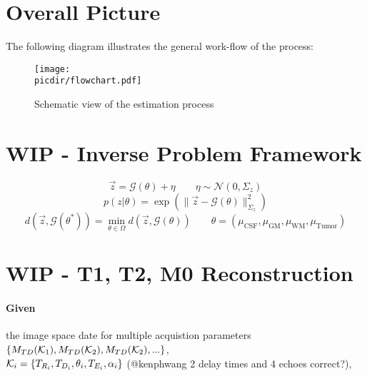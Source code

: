 \documentclass{article}         %
\theoremstyle{definition}
\theoremstyle{remark}
\newcommand{\picdir}{pdffig/}
\begin{document}


\section{Overall Picture}
The following diagram illustrates the general work-flow of the process:
\begin{figure}[h!!]
\center
\texttt{[image: \\picdir/flowchart.pdf]}
\caption{Schematic view of the estimation process}
\end{figure}

\section{WIP - Inverse Problem Framework}\label{InverseProbFramework}
\[
  \vec{z}  = \mathcal{G}(\theta) + \eta   \qquad   \eta \sim \mathcal{N}(0,\Sigma_z)
\]
\[
  p(z|\theta ) = \exp \left( \|\vec{z} -  \mathcal{G}(\theta)\|^2_{\Sigma_z} \right)
\]
\[
               d\left(\vec{z}, \mathcal{G}(\theta^*)\right) = 
   \min_{\theta \in \Omega} d\left(\vec{z}, \mathcal{G}(\theta)\right)
\qquad
\theta = \left(\mu_\text{CSF}, \mu_\text{GM}, \mu_\text{WM}, \mu_\text{Tumor} \right)
\]

\section{WIP - T1, T2, M0 Reconstruction}
\paragraph{Given}
the image space date for  multiple  acquistion parameters 
$\{ M_{TD}(\mathcal{K}_1),M_{TD}(\mathcal{K}_2), M_{TD}(\mathcal{K}_2),... \}$,  \\
 $\mathcal{K}_i=\{T_{R_i},T_{D_i},\theta_i,T_{E_i},\alpha_i\}$ 
{\color{red}(@kenphwang 2 delay times and 4 echoes correct?)},
\end{document}
